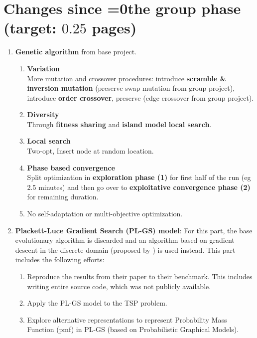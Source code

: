 \documentclass[a4paper,10pt]{article}
\def\retake{0}
\newcommand{\switch}[2]{\ifnum\retake=0{#1}\else{#2}\fi}
\newcommand{\ReplaceMe}[1]{{\color{blue}#1}}
\begin{document}
\section{Changes since \switch{the group phase}{your previous submission} (target: $0.25$ pages)}

\begin{enumerate}
	\item \textbf{Genetic algorithm} from base project.
	\begin{enumerate}
	\item \textbf{Variation} \\
			More mutation and crossover procedures: introduce \textbf{scramble \& inversion mutation} (preserve swap mutation from group project), introduce \textbf{order crossover}, preserve (edge crossover from group project).
				
	\item \textbf{Diversity} \\
			Through \textbf{fitness sharing} and \textbf{island model} \textbf{local search}.

	\item \textbf{Local search} \\
			Two-opt, Insert node at random location.
	
	\item \textbf{Phase based convergence} \\
		Split optimization in \textbf{exploration phase (1)} for first half of the run (eg 2.5 minutes) and then go over to \textbf{exploitative convergence phase (2)} for remaining duration.
		
	\item No self-adaptation or multi-objective optimization.
	\end{enumerate}
	
	\item \textbf{Plackett-Luce Gradient Search (PL-GS) model}: For this part, the base evolutionary algorithm is discarded and an algorithm based on gradient descent in the discrete domain (proposed by \citep{ceberiojosu_model-based_2023, santucci_gradient_2020}) is used instead. This part includes the following efforts:
		\begin{enumerate}
			\item Reproduce the results from their paper to their benchmark. This includes writing entire source code, which was not publicly available.
			\item Apply the PL-GS model to the TSP problem.
			\item Explore alternative representations to represent Probability Mass Function (pmf) in PL-GS (based on Probabilistic Graphical Models).
		\end{enumerate}
	
\end{enumerate}
\end{document}
